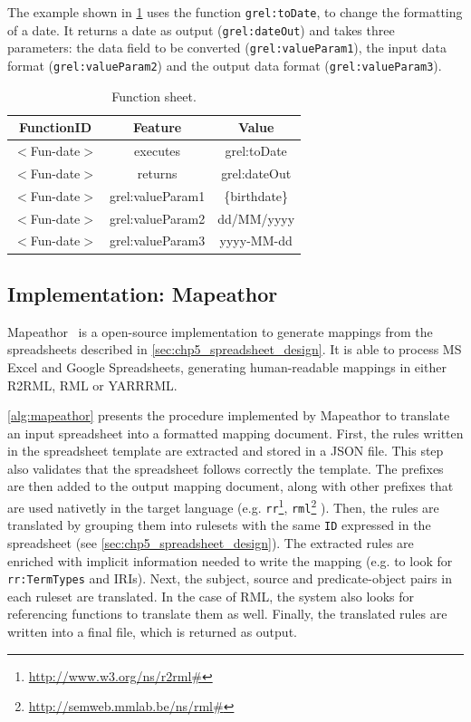 The example shown in \cref{tab:chp5-1_function_sheet} uses the function \texttt{grel:toDate}, to change the formatting of a date. It returns a date as output (\texttt{grel:dateOut}) and takes three parameters: the data field to be converted (\texttt{grel:valueParam1}), the input data format (\texttt{grel:valueParam2}) and the output data format (\texttt{grel:valueParam3}).

\begin{table}[h!]
\caption{Function sheet.}
\label{tab:chp5-1_function_sheet}
\centering
\begin{tabular}{c|c|c}
\midrule
\textbf{FunctionID} & \textbf{Feature} & \textbf{Value} \\ \midrule
$<$Fun-date$>$ & executes & grel:toDate \\  
$<$Fun-date$>$ & returns & grel:dateOut \\  
$<$Fun-date$>$ & grel:valueParam1 & \{birthdate\} \\
$<$Fun-date$>$ & grel:valueParam2 & dd/MM/yyyy \\
$<$Fun-date$>$ & grel:valueParam3 & yyyy-MM-dd \\
\midrule
\end{tabular}
\end{table}


\subsection{Implementation: Mapeathor}
\label{sec:chp5_mapeathor_tool}

Mapeathor~\cite{iglesias-molina_2023_5973906} is a open-source implementation to generate mappings from the spreadsheets described in \cref{sec:chp5_spreadsheet_design}. It is able to process MS Excel and Google Spreadsheets, generating human-readable mappings in either R2RML, RML or YARRRML. 

\cref{alg:mapeathor} presents the procedure implemented by Mapeathor to translate an input spreadsheet into a formatted mapping document. First, the rules written in the spreadsheet template are extracted and stored in a JSON file. This step also validates that the spreadsheet follows correctly the template. The prefixes are then added to the output mapping document, along with other prefixes that are used nativetly in the target language (e.g. \texttt{rr}\footnote{\url{http://www.w3.org/ns/r2rml\#}}, \texttt{rml}\footnote{\url{http://semweb.mmlab.be/ns/rml\#}} ). Then, the rules are translated by grouping them into rulesets with the same \texttt{ID} expressed in the spreadsheet (see \cref{sec:chp5_spreadsheet_design}). The extracted rules are enriched with implicit information needed to write the mapping (e.g. to look for \texttt{rr:TermTypes} and IRIs). Next, the subject, source and predicate-object pairs in each ruleset are translated. In the case of RML, the system also looks for referencing functions to translate them as well. Finally, the translated rules are written into a final file, which is returned as output. 



